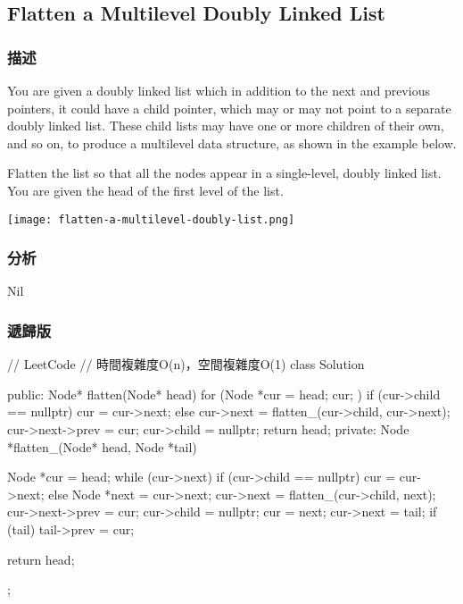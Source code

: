 \subsection{Flatten a Multilevel Doubly Linked List}
\label{sec:flatten-a-multilevel-doubly-linked-list}


\subsubsection{描述}
You are given a doubly linked list which in addition to the next and previous pointers, it could have a child pointer, which may or may not point to a separate doubly linked list. These child lists may have one or more children of their own, and so on, to produce a multilevel data structure, as shown in the example below.

Flatten the list so that all the nodes appear in a single-level, doubly linked list. You are given the head of the first level of the list.

\begin{center}
\texttt{[image: flatten-a-multilevel-doubly-list.png]}\\
\label{fig:flatten-a-multilevel-double-list}
\end{center}

\subsubsection{分析}
Nil

\subsubsection{遞歸版}
\begin{Code}
// LeetCode
// 時間複雜度O(n)，空間複雜度O(1)
class Solution {
public:
    Node* flatten(Node* head) {
        for (Node *cur = head; cur; ) {
            if (cur->child == nullptr)
                cur = cur->next;
            else {
                cur->next = flatten_(cur->child, cur->next);
                cur->next->prev = cur;
                cur->child = nullptr;
            }
        }
        return head;
    }
private:
    Node *flatten_(Node* head, Node *tail) {
        Node *cur = head;
        while (cur->next) {
            if (cur->child == nullptr)
                cur = cur->next;
            else {
                Node *next = cur->next;
                cur->next = flatten_(cur->child, next);
                cur->next->prev = cur;
                cur->child = nullptr;
                cur = next;
            }
        }
        cur->next = tail;
        if (tail)
            tail->prev = cur;

        return head;
    }
};
\end{Code}

